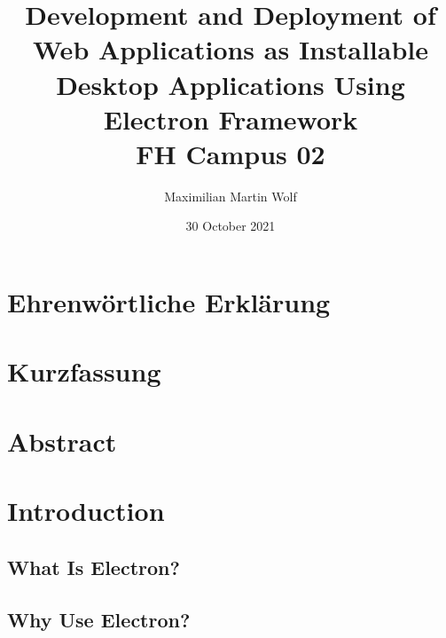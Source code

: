 \documentclass[11pt]{article}
\title{
        {Development and Deployment of Web Applications as Installable Desktop Applications Using
    Electron Framework}\\
    {\large FH Campus 02}\\
}
\author{Maximilian Martin Wolf}
\date{30 October 2021}
\begin{document}

    \maketitle
    \clearpage

    \section*{Ehrenwörtliche Erklärung}\label{sec:ehrenwort}
    
    \clearpage
    \section*{Kurzfassung}\label{sec:kurzfassung}
    
    \clearpage
    \section*{Abstract}\label{sec:abstract}
    
    \clearpage

    \tableofcontents
    \clearpage

    \titleformat{\section}{\bfseries\sffamily\large\MakeUppercase}{\thesection}{0pt}{\hspace{9cm}}{}%

    \setcounter{page}{6}

    \section{Introduction}\label{sec:introduction}
    \setcounter{tocdepth}{3}
    

    \subsection{What Is Electron?}\label{subsec:what-is-electron}
    

    \subsection{Why Use Electron?}\label{subsec:why-use-electron}
    
\end{document}
